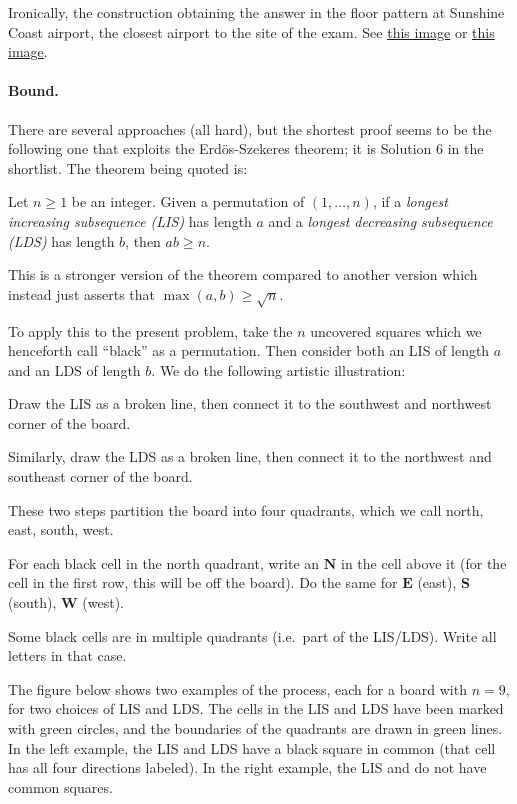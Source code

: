 \documentclass[11pt]{scrartcl}
\begin{document}
\begin{remark*}
  Ironically, the construction obtaining the answer
  in the floor pattern at Sunshine Coast airport,
  the closest airport to the site of the exam.
  See \href{https://i0.wp.com/havewheelchairwilltravel.net/wp-content/uploads/2019/10/IMG_6815.jpg}{this image}
  or \href{https://stea.com.au/wp-content/uploads/2020/12/sunshine-coast-airport-design-stea-architectural-projects-20.jpg}{this image}.
\end{remark*}

\paragraph{Bound.}
There are several approaches (all hard), but
the shortest proof seems to be the following one that exploits
the Erd\"{o}s-Szekeres theorem; it is Solution 6 in the shortlist.
The theorem being quoted is:
\begin{theorem*}
  Let $n \ge 1$ be an integer.
  Given a permutation of $(1, \dots, n)$,
  if a \emph{longest increasing subsequence (LIS)} has length $a$ and
  a \emph{longest decreasing subsequence (LDS)} has length $b$, then $ab \ge n$.
\end{theorem*}
This is a stronger version of the theorem compared to another version
which instead just asserts that $\max(a,b) \ge \sqrt n$.

To apply this to the present problem, take the $n$ uncovered squares
which we henceforth call ``black'' as a permutation.
Then consider both an LIS of length $a$ and an LDS of length $b$.
We do the following artistic illustration:
\begin{itemize}
  \ii Draw the LIS as a broken line,
  then connect it to the southwest and northwest corner of the board.

  \ii Similarly, draw the LDS as a broken line,
  then connect it to the northwest and southeast corner of the board.

  \ii These two steps partition the board into four quadrants,
  which we call north, east, south, west.

  \ii For each black cell in the north quadrant,
  write an $\mathbf{N}$ in the cell above it
  (for the cell in the first row, this will be off the board).
  Do the same for $\mathbf{E}$ (east), $\mathbf{S}$ (south), $\mathbf{W}$ (west).

  \ii Some black cells are in multiple quadrants (i.e.\ part of the LIS/LDS).
  Write all letters in that case.
\end{itemize}
The figure below shows two examples of the process,
each for a board with $n=9$, for two choices of LIS and LDS.
The cells in the LIS and LDS have been marked with green circles,
and the boundaries of the quadrants are drawn in green lines.
In the left example, the LIS and LDS have a black square in common
(that cell has all four directions labeled).
In the right example, the LIS and do not have common squares.
\end{document}
